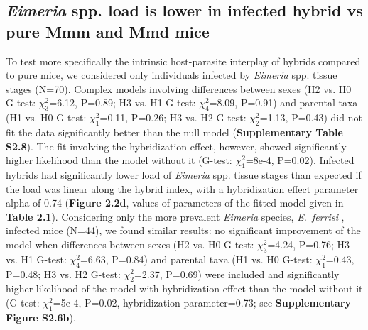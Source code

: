 \subsection{\textit{Eimeria} spp. load is lower in infected hybrid vs pure Mmm and Mmd mice} 
To test more specifically the intrinsic host-parasite interplay of hybrids compared to pure mice, we considered only individuals infected by \textit{Eimeria} spp. tissue stages (N=70). Complex models involving differences between sexes (H2 vs. H0 G-test: $\chi_{3}^{2}$=6.12, P=0.89; H3 vs. H1 G-test: $\chi_{4}^{2}$=8.09, P=0.91) and parental taxa (H1 vs. H0 G-test: $\chi_{1}^{2}$=0.11, P=0.26; H3 vs. H2 G-test: $\chi_{2}^{2}$=1.13, P=0.43) did not fit the data significantly better than the null model (\textbf{Supplementary Table S2.8}). The fit involving the hybridization effect, however, showed significantly higher likelihood than the model without it (G-test: $\chi_{1}^{2}$=8e-4, P=0.02). Infected hybrids had significantly lower load of \textit{Eimeria} spp. tissue stages than expected if the load was linear along the hybrid index, with a hybridization effect parameter alpha of 0.74 (\textbf{Figure 2.2d}, values of parameters of the fitted model given in \textbf{Table 2.1}). Considering only the more prevalent \textit{Eimeria} species, \textit{E.~ferrisi} , infected mice (N=44), we found similar results: no significant improvement of the model when differences between sexes (H2 vs. H0 G-test: $\chi_{3}^{2}$=4.24, P=0.76; H3 vs. H1 G-test: $\chi_{4}^{2}$=6.63, P=0.84) and parental taxa (H1 vs. H0 G-test: $\chi_{1}^{2}$=0.43, P=0.48; H3 vs. H2 G-test: $\chi_{2}^{2}$=2.37, P=0.69) were included and significantly higher likelihood of the model with hybridization effect than the model without it (G-test: $\chi_{1}^{2}$=5e-4, P=0.02, hybridization parameter=0.73; see \textbf{Supplementary Figure S2.6b}). 

